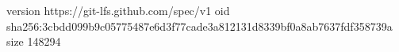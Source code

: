 version https://git-lfs.github.com/spec/v1
oid sha256:3cbdd099b9c05775487e6d3f77cade3a812131d8339bf0a8ab7637fdf358739a
size 148294
